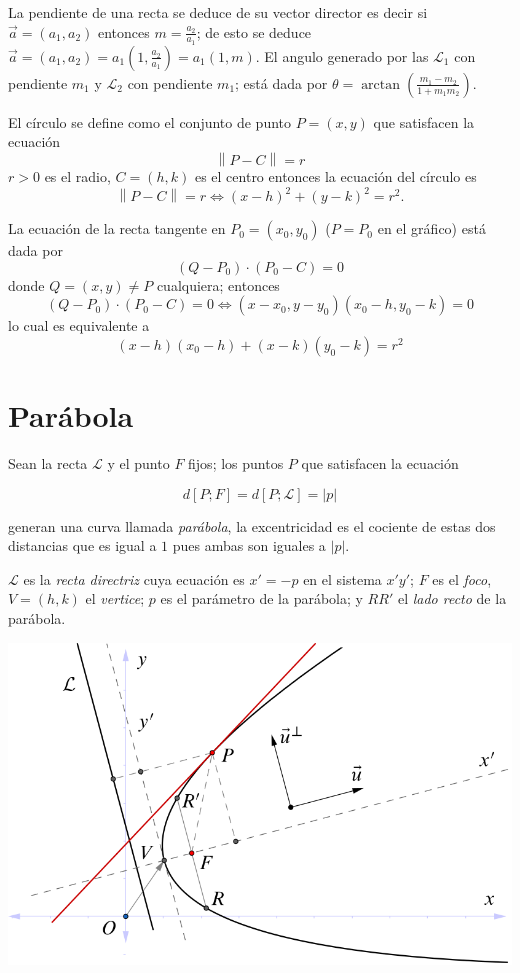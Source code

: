 \documentclass[12pt,]{report}
\let\origfigure=\figure
\let\endorigfigure=\endfigure
\renewenvironment{figure}[1][]{%
  \origfigure[H]
}{%
  \endorigfigure
}
\theoremstyle{slplain}
\begin{document}
La pendiente de una recta se deduce de su vector director es decir si \(\vec{a}=(a_1,a_2)\) entonces \(m=\frac{a_2}{a_1}\); de esto se deduce \(\vec{a}=(a_1,a_2)=a_1(1,\frac{a_2}{a_1})=a_1(1,m)\). El angulo generado por las \(\mathcal{L}_1\) con pendiente \(m_1\) y \(\mathcal{L}_2\) con pendiente \(m_1\); está dada por \(\theta=\arctan\left(\frac{m_1-m_2}{1+m_1m_2}\right)\).

El círculo se define como el conjunto de punto \(P=(x,y)\) que satisfacen la ecuación \[\left \|P-C\right\|=r\] \(r>0\) es el radio, \(C=(h,k)\) es el centro entonces la ecuación del círculo es \[\left \|P-C\right\|=r\iff (x-h)^2+(y-k)^2=r^2.\]

La ecuación de la recta tangente en \(P_0=(x_0,y_0)\) (\(P=P_0\) en el gráfico) está dada por \[(Q-P_0)\cdot(P_0-C)=0\] donde \(Q=(x,y)\neq P\) cualquiera; entonces \[(Q-P_0)\cdot(P_0-C)=0\iff  (x-x_0,y-y_0)(x_0-h,y_0-k)=0\] lo cual es equivalente a \[(x-h)(x_0-h)+(x-k)(y_0-k)=r^2\]

\hypertarget{paruxe1bola}{%
\chapter{Parábola}\label{paruxe1bola}}

Sean la recta \(\mathcal{L}\) y el punto \(F\) fijos; los puntos \(P\) que satisfacen la ecuación

\begin{equation} 
d\left[P;F\right]=d\left[P;\mathcal{L}\right]=\left|p\right|\label{eq:www}
\end{equation}

generan una curva llamada \emph{parábola}, la excentricidad es el cociente de estas dos distancias que es igual a \(1\) pues ambas son iguales a \(\left|p\right|\).

\(\mathcal{L}\) es la \emph{recta directriz} cuya ecuación es \(x'=-p\) en el sistema \(x'y'\); \(F\) es el \emph{foco}, \(V=(h,k)\) el \emph{vertice}; \(p\) es el parámetro de la parábola; y \(RR'\) el \emph{lado recto} de la parábola.

\begin{figure}

{\centering \includegraphics{parabola} 

}

\caption{Elipse vectorial}\label{fig:hiperbola1}
\end{figure}
\end{document}
